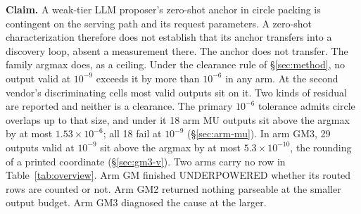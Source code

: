 \textbf{Claim.} A weak-tier LLM proposer's zero-shot anchor in circle packing is contingent on
the serving path and its request parameters. A zero-shot
characterization therefore does not establish that its anchor transfers into a discovery
loop, absent a measurement there. The anchor does not transfer. The family argmax does, as a
ceiling. Under the clearance rule of \S\ref{sec:method}, no output valid at $10^{-9}$
exceeds it by more than $10^{-6}$ in any arm. At the second vendor's discriminating cells
most valid outputs sit on it. Two kinds of residual are reported and neither is a clearance.
The primary $10^{-6}$ tolerance admits circle overlaps up to
that size, and under it 18 arm MU outputs sit above the argmax by at most
$1.53\times10^{-6}$; all 18 fail at $10^{-9}$
(\S\ref{sec:arm-mu}). In arm GM3, 29 outputs valid at $10^{-9}$ sit above the argmax by at
most $5.3\times10^{-10}$, the rounding of a printed coordinate (\S\ref{sec:gm3-v}). Two arms carry no row in Table~\ref{tab:overview}. Arm
GM finished UNDERPOWERED whether its routed rows are counted or not. Arm GM2 returned nothing
parseable at the smaller output budget. Arm GM3 diagnosed the cause at the larger.

